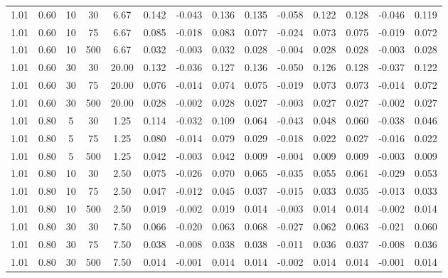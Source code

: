 \documentclass[12pt,epsfig]{article}
\begin{document}
\begin{table} [h]
{\begin{tabular}{| c | c | c | c | c || c | c | c || c | c | c || c | c | c |}
  1.01 & 0.60 &  10 &  30 & 6.67 & 0.142 & -0.043 & 0.136 & 0.135 & -0.058 & 0.122 & 0.128 & -0.046 & 0.119 \\ 
  1.01 & 0.60 &  10 &  75 & 6.67 & 0.085 & -0.018 & 0.083 & 0.077 & -0.024 & 0.073 & 0.075 & -0.019 & 0.072 \\ 
  1.01 & 0.60 &  10 & 500 & 6.67 & 0.032 & -0.003 & 0.032 & 0.028 & -0.004 & 0.028 & 0.028 & -0.003 & 0.028 \\ 
  1.01 & 0.60 &  30 &  30 & 20.00 & 0.132 & -0.036 & 0.127 & 0.136 & -0.050 & 0.126 & 0.128 & -0.037 & 0.122 \\ 
  1.01 & 0.60 &  30 &  75 & 20.00 & 0.076 & -0.014 & 0.074 & 0.075 & -0.019 & 0.073 & 0.073 & -0.014 & 0.072 \\ 
  1.01 & 0.60 &  30 & 500 & 20.00 & 0.028 & -0.002 & 0.028 & 0.027 & -0.003 & 0.027 & 0.027 & -0.002 & 0.027 \\ 
  1.01 & 0.80 &   5 &  30 & 1.25 & 0.114 & -0.032 & 0.109 & 0.064 & -0.043 & 0.048 & 0.060 & -0.038 & 0.046 \\ 
  1.01 & 0.80 &   5 &  75 & 1.25 & 0.080 & -0.014 & 0.079 & 0.029 & -0.018 & 0.022 & 0.027 & -0.016 & 0.022 \\ 
  1.01 & 0.80 &   5 & 500 & 1.25 & 0.042 & -0.003 & 0.042 & 0.009 & -0.004 & 0.009 & 0.009 & -0.003 & 0.009 \\ 
  1.01 & 0.80 &  10 &  30 & 2.50 & 0.075 & -0.026 & 0.070 & 0.065 & -0.035 & 0.055 & 0.061 & -0.029 & 0.053 \\ 
  1.01 & 0.80 &  10 &  75 & 2.50 & 0.047 & -0.012 & 0.045 & 0.037 & -0.015 & 0.033 & 0.035 & -0.013 & 0.033 \\ 
  1.01 & 0.80 &  10 & 500 & 2.50 & 0.019 & -0.002 & 0.019 & 0.014 & -0.003 & 0.014 & 0.014 & -0.002 & 0.014 \\ 
  1.01 & 0.80 &  30 &  30 & 7.50 & 0.066 & -0.020 & 0.063 & 0.068 & -0.027 & 0.062 & 0.063 & -0.021 & 0.060 \\ 
  1.01 & 0.80 &  30 &  75 & 7.50 & 0.038 & -0.008 & 0.038 & 0.038 & -0.011 & 0.036 & 0.037 & -0.008 & 0.036 \\ 
  1.01 & 0.80 &  30 & 500 & 7.50 & 0.014 & -0.001 & 0.014 & 0.014 & -0.002 & 0.014 & 0.014 & -0.001 & 0.014 \\ 
   \hline
\end{tabular}
}

\end{table}
\end{document}
